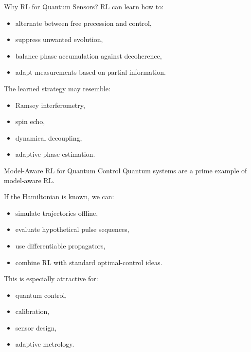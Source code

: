 \documentclass[aspectratio=169]{beamer}
\begin{document}
\begin{frame}{Why RL for Quantum Sensors?}
  RL can learn how to:
  \begin{itemize}
  \item alternate between free precession and control,
  \item suppress unwanted evolution,
  \item balance phase accumulation against decoherence,
  \item adapt measurements based on partial information.
  \end{itemize}

  The learned strategy may resemble:
  \begin{itemize}
  \item Ramsey interferometry,
  \item spin echo,
  \item dynamical decoupling,
  \item adaptive phase estimation.
  \end{itemize}
\end{frame}

\begin{frame}{Model-Aware RL for Quantum Control}
  Quantum systems are a prime example of model-aware RL.

  If the Hamiltonian is known, we can:
  \begin{itemize}
  \item simulate trajectories offline,
  \item evaluate hypothetical pulse sequences,
  \item use differentiable propagators,
  \item combine RL with standard optimal-control ideas.
  \end{itemize}

  This is especially attractive for:
  \begin{itemize}
  \item quantum control,
  \item calibration,
  \item sensor design,
  \item adaptive metrology.
  \end{itemize}
\end{frame}
\end{document}

